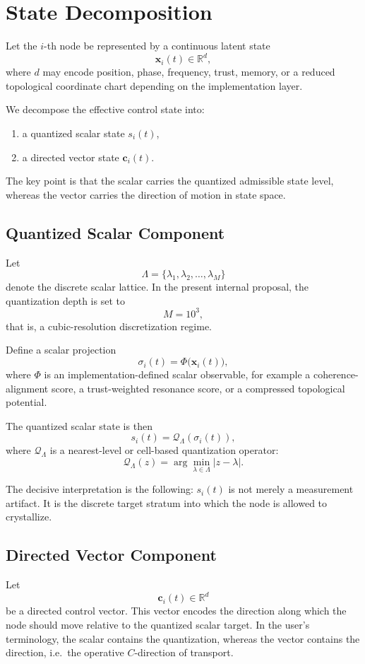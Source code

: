 \documentclass[11pt,a4paper]{article}
\begin{document}
\section{State Decomposition}
Let the $i$-th node be represented by a continuous latent state
\[
\mathbf{x}_i(t) \in \mathbb{R}^d,
\]
where $d$ may encode position, phase, frequency, trust, memory, or a reduced
topological coordinate chart depending on the implementation layer.

We decompose the effective control state into:
\begin{enumerate}[label=\arabic*.]
    \item a quantized scalar state $s_i(t)$,
    \item a directed vector state $\mathbf{c}_i(t)$.
\end{enumerate}

The key point is that the scalar carries the quantized admissible state level,
whereas the vector carries the direction of motion in state space.

\subsection{Quantized Scalar Component}
Let
\[
\Lambda = \{\lambda_1, \lambda_2, \dots, \lambda_M\}
\]
denote the discrete scalar lattice. In the present internal proposal, the
quantization depth is set to
\[
M = 10^3,
\]
that is, a cubic-resolution discretization regime.

Define a scalar projection
\[
\sigma_i(t) = \Phi\bigl(\mathbf{x}_i(t)\bigr),
\]
where $\Phi$ is an implementation-defined scalar observable, for example a
coherence-alignment score, a trust-weighted resonance score, or a compressed
topological potential.

The quantized scalar state is then
\[
s_i(t) = \mathcal{Q}_{\Lambda}\!\left(\sigma_i(t)\right),
\]
where $\mathcal{Q}_{\Lambda}$ is a nearest-level or cell-based quantization
operator:
\[
\mathcal{Q}_{\Lambda}(z) = \arg\min_{\lambda \in \Lambda} |z - \lambda|.
\]

The decisive interpretation is the following: $s_i(t)$ is not merely a
measurement artifact. It is the discrete target stratum into which the node is
allowed to crystallize.

\subsection{Directed Vector Component}
Let
\[
\mathbf{c}_i(t) \in \mathbb{R}^d
\]
be a directed control vector. This vector encodes the direction along which the
node should move relative to the quantized scalar target. In the user's
terminology, the scalar contains the quantization, whereas the vector contains
the direction, i.e.\ the operative $C$-direction of transport.
\end{document}
